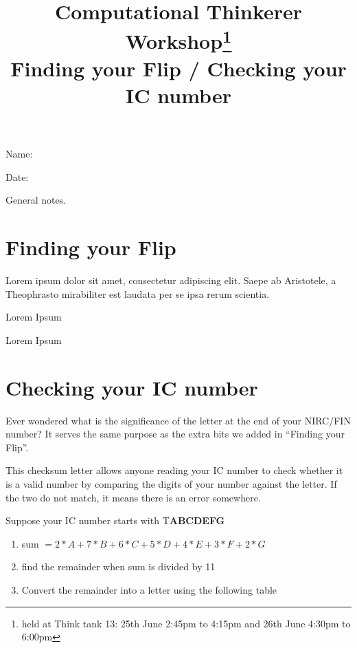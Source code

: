 \documentclass[a4paper,12pt]{article}
\title{Computational Thinkerer Workshop\footnote{held at Think tank 13: 25th June 2:45pm to 4:15pm and 26th June 4:30pm to 6:00pm}\\
Finding your Flip / Checking your IC number
\vspace{-2cm}}
\date{}
\newcommand\Blank[2][.33\linewidth]{%
  \rule{0pt}{4ex}%
  #2\enspace
  \makebox[#1]{\hrulefill}}
\begin{document}
\maketitle
\begin{flushright}
  \Blank{Name:}

  \Blank{Date:}
\end{flushright}

General notes.

\section{Finding your Flip}
Lorem ipsum dolor sit amet, consectetur adipiscing elit.   Saepe ab Aristotele,
a Theophrasto mirabiliter est laudata per se ipsa rerum scientia.

\begin{question}
Lorem Ipsum
\end{question}

\begin{question}
Lorem Ipsum
\end{question}

\newpage
\section{Checking your IC number}
Ever wondered what is the significance of the letter at the end of your NIRC/FIN
number? It serves the same purpose as the extra bits we added in
``Finding your Flip''.

This checksum letter allows anyone reading your IC number to check
whether it is a valid number by comparing the digits of your number against the
letter. If the two do not match, it means there is an error somewhere.

Suppose your IC number starts with T\textbf{ABCDEFG}
\begin{enumerate}
    \item sum $= 2 * A + 7 * B + 6 * C + 5 * D + 4 * E + 3 * F + 2 * G$
    \item find the remainder when sum is divided by 11
    \item Convert the remainder into a letter using the following table
\end{enumerate}
\end{document}

